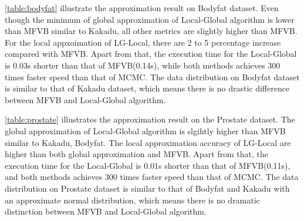 \autoref{table:bodyfat} illustrate the approximation result on Bodyfat dataset. Even though the minimum of global approximation of Local-Global algorithm is lower than MFVB similar to Kakadu, all other metrics are slightly higher than MFVB. For the local appxoimation of LG-Local, there are 2 to 5 percentage increase compared with MFVB. Apart from that, the execution time for the Local-Global is 0.03s shorter than that of MFVB(0.14s), while both methods achieves 300 times faster speed than that of MCMC.
The data distribution on Bodyfat dataset is similar to that of Kakadu dataset, which means there is no drastic difference between MFVB and Local-Global algorithm.\\
\begin{table}[!h]
	\caption{Experiment Result on Prostate dataset}
	\label{table:prostate}
\end{table}
\autoref{table:prostate} illustrates the approximation result on the Prostate dataset.  The global approximation of Local-Global algorithm is slgihtly higher than MFVB similar to Kakadu, Bodyfat. The local approximation accuracy of LG-Local are higher than both global approximation and MFVB. Apart from that, the execution time for the Local-Global is 0.01s shorter than that of MFVB(0.11s), and both methods achieves 300 times faster speed than that of MCMC.
The data distribution on Prostate dataset is similar to that of Bodyfat and Kakadu with an approximate normal distribution, which means there is no dramatic distinction between MFVB and Local-Global algorithm.\\
